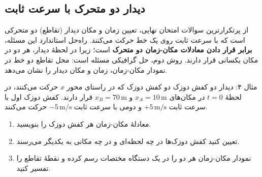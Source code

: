 \documentclass[12pt, a4paper]{article}
\begin{document}
\subsection{دیدار دو متحرک با سرعت ثابت}

از پرتکرارترین سوالات امتحان نهایی، تعیین زمان و مکان دیدار (تقاطع) دو متحرکی است که با سرعت ثابت روی یک خط حرکت می‌کنند. راه‌حل استاندارد این مسئله، \textbf{برابر قرار دادن معادلات مکان-زمان دو متحرک} است؛ زیرا در لحظهٔ دیدار، هر دو در مکان یکسانی قرار دارند. روش دوم، حل گرافیکی مسئله است: محل تقاطع دو خط در نمودار مکان-زمان، زمان و مکان دیدار را نشان می‌دهد.

\begin{exambox}{مثال ۴: دیدار دو کفش دوزک}
دو کفش دوزک که در راستای محور $x$ حرکت می‌کنند، در لحظهٔ $t=0$ در مکان‌های $x_A = 10\,\text{m}$ و $x_B = 70\,\text{m}$ قرار دارند. کفش دوزک اول با سرعت ثابت $+5\,\text{m/s}$ و دومی با سرعت ثابت $-5\,\text{m/s}$ حرکت می‌کنند.

\begin{enumerate}
    \item[الف)] معادلهٔ مکان-زمان هر کفش دوزک را بنویسید.
    \item[ب)] تعیین کنید کفش دوزک‌ها در چه لحظه‌ای و در چه مکانی به یکدیگر می‌رسند.
    \item[پ)] نمودار مکان-زمان هر دو را در یک دستگاه مختصات رسم کرده و نقطهٔ تقاطع را تفسیر کنید.
\end{enumerate}
\end{exambox}
\end{document}
